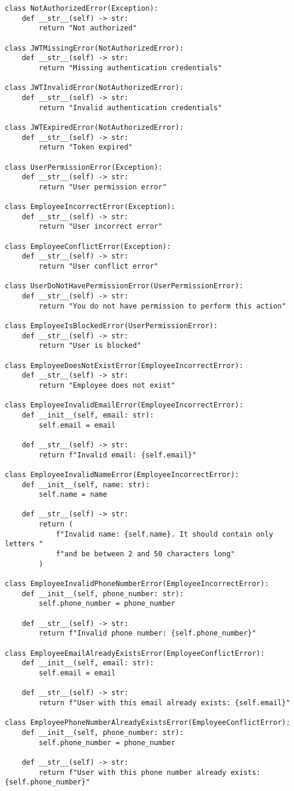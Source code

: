 \begin{lstlisting}[style=pythonstyle]
class NotAuthorizedError(Exception):
    def __str__(self) -> str:
        return "Not authorized"

class JWTMissingError(NotAuthorizedError):
    def __str__(self) -> str:
        return "Missing authentication credentials"

class JWTInvalidError(NotAuthorizedError):
    def __str__(self) -> str:
        return "Invalid authentication credentials"

class JWTExpiredError(NotAuthorizedError):
    def __str__(self) -> str:
        return "Token expired"

class UserPermissionError(Exception):
    def __str__(self) -> str:
        return "User permission error"

class EmployeeIncorrectError(Exception):
    def __str__(self) -> str:
        return "User incorrect error"

class EmployeeConflictError(Exception):
    def __str__(self) -> str:
        return "User conflict error"

class UserDoNotHavePermissionError(UserPermissionError):
    def __str__(self) -> str:
        return "You do not have permission to perform this action"

class EmployeeIsBlockedError(UserPermissionError):
    def __str__(self) -> str:
        return "User is blocked"

class EmployeeDoesNotExistError(EmployeeIncorrectError):
    def __str__(self) -> str:
        return "Employee does not exist"

class EmployeeInvalidEmailError(EmployeeIncorrectError):
    def __init__(self, email: str):
        self.email = email

    def __str__(self) -> str:
        return f"Invalid email: {self.email}"

class EmployeeInvalidNameError(EmployeeIncorrectError):
    def __init__(self, name: str):
        self.name = name

    def __str__(self) -> str:
        return (
            f"Invalid name: {self.name}. It should contain only letters "
            f"and be between 2 and 50 characters long"
        )

class EmployeeInvalidPhoneNumberError(EmployeeIncorrectError):
    def __init__(self, phone_number: str):
        self.phone_number = phone_number

    def __str__(self) -> str:
        return f"Invalid phone number: {self.phone_number}"

class EmployeeEmailAlreadyExistsError(EmployeeConflictError):
    def __init__(self, email: str):
        self.email = email

    def __str__(self) -> str:
        return f"User with this email already exists: {self.email}"

class EmployeePhoneNumberAlreadyExistsError(EmployeeConflictError):
    def __init__(self, phone_number: str):
        self.phone_number = phone_number

    def __str__(self) -> str:
        return f"User with this phone number already exists: {self.phone_number}"
\end{lstlisting}
